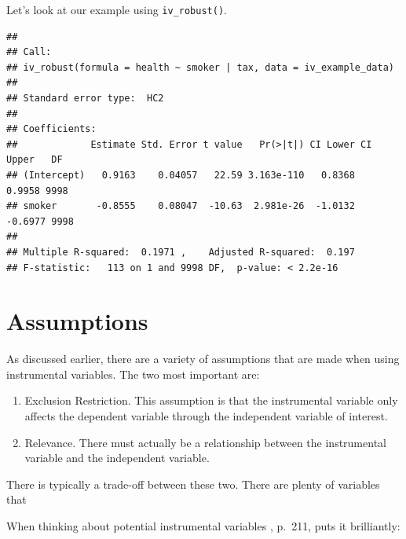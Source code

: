 \documentclass[
]{book}
\newenvironment{Shaded}{\begin{snugshade}}{\end{snugshade}}
\newcommand{\DataTypeTok}[1]{\textcolor[rgb]{0.13,0.29,0.53}{#1}}
\newcommand{\KeywordTok}[1]{\textcolor[rgb]{0.13,0.29,0.53}{\textbf{#1}}}
\newcommand{\NormalTok}[1]{#1}
\newcommand{\OperatorTok}[1]{\textcolor[rgb]{0.81,0.36,0.00}{\textbf{#1}}}
\newcommand{\StringTok}[1]{\textcolor[rgb]{0.31,0.60,0.02}{#1}}
\providecommand{\tightlist}{%
  \setlength{\itemsep}{0pt}\setlength{\parskip}{0pt}}
\begin{document}
Let's look at our example using \texttt{iv\_robust()}.

\begin{Shaded}
\end{Shaded}

\begin{verbatim}
## 
## Call:
## iv_robust(formula = health ~ smoker | tax, data = iv_example_data)
## 
## Standard error type:  HC2 
## 
## Coefficients:
##             Estimate Std. Error t value   Pr(>|t|) CI Lower CI Upper   DF
## (Intercept)   0.9163    0.04057   22.59 3.163e-110   0.8368   0.9958 9998
## smoker       -0.8555    0.08047  -10.63  2.981e-26  -1.0132  -0.6977 9998
## 
## Multiple R-squared:  0.1971 ,    Adjusted R-squared:  0.197 
## F-statistic:   113 on 1 and 9998 DF,  p-value: < 2.2e-16
\end{verbatim}

\hypertarget{assumptions-1}{%
\section{Assumptions}\label{assumptions-1}}

As discussed earlier, there are a variety of assumptions that are made when using instrumental variables. The two most important are:

\begin{enumerate}
\def\labelenumi{\arabic{enumi}.}
\tightlist
\item
  Exclusion Restriction. This assumption is that the instrumental variable only affects the dependent variable through the independent variable of interest.
\item
  Relevance. There must actually be a relationship between the instrumental variable and the independent variable.
\end{enumerate}

There is typically a trade-off between these two. There are plenty of variables that

When thinking about potential instrumental variables \citet{cunninghamnorap}, p.~211, puts it brilliantly:
\end{document}
